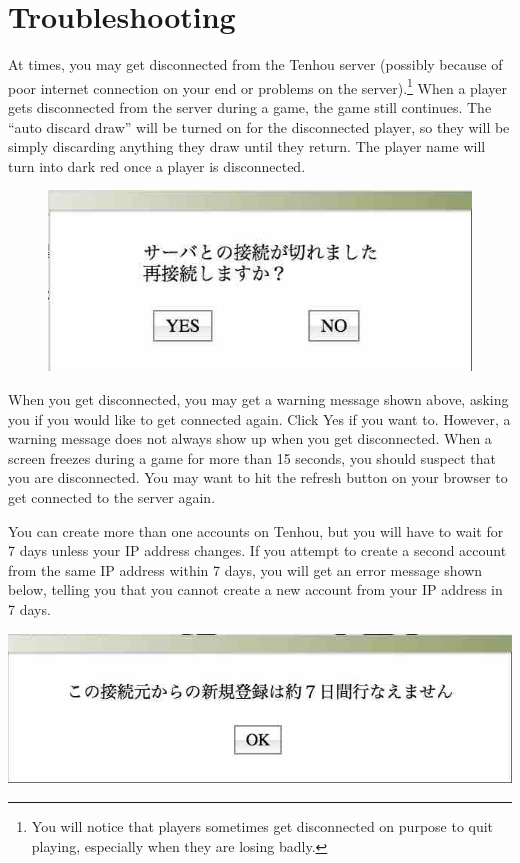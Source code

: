 \newpage
\section{Troubleshooting}

At times, you may get disconnected from the {\jap Tenhou} server (possibly because of poor internet connection on your end or problems on the server).\footnote{You will notice that players sometimes get disconnected on purpose to quit playing, especially when they are losing badly.}
When a player gets disconnected from the server during a game, the game still continues. The ``auto discard draw'' will be turned on for the disconnected player, so they will be simply discarding anything they draw until they return. The player name will turn into dark red once a player is disconnected.

\begin{figure}
\vspace{-10pt}
\begin{center}
\includegraphics[width=.45\textwidth,clip]{figs/warning2.jpg}
\end{center}
\vspace{-10pt}
\end{figure}

\bigskip
When you get disconnected, you may get a warning message shown above, asking you if you would like to get connected again. Click Yes if you want to. However, a warning message does not always show up when you get disconnected. When a screen freezes during a game for more than 15 seconds, you should suspect that you are disconnected. You may want to hit the refresh button on your browser to get connected to the server again.

\bigskip
You can create more than one accounts on {\jap Tenhou}, but you will have to wait for 7 days unless your IP address changes. If you attempt to create a second account from the same IP address within 7 days, you will get an error message shown below, telling you that you cannot create a new account from your IP address in 7 days.

\begin{center}
\includegraphics[width=.5\textwidth,clip]{figs/warning1.jpg}
\end{center}

